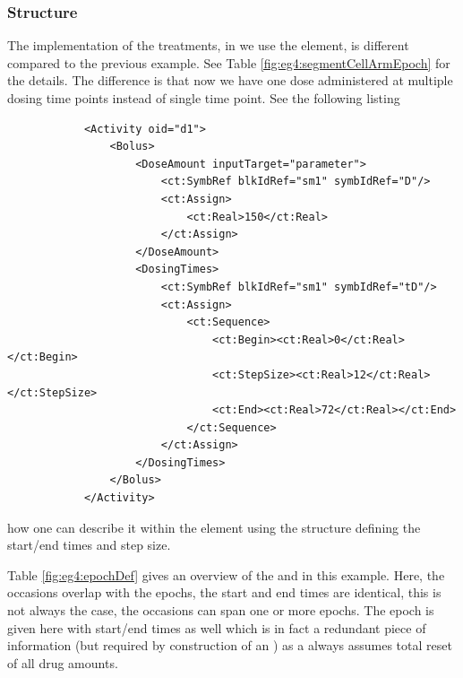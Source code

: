 \subsubsection{Structure}
The implementation of the treatments, in \pharmml we use the
 element, is different compared to the previous example. 
See Table \ref{fig:eg4:segmentCellArmEpoch} for the details. The difference
is that now we have one dose administered at multiple dosing time points 
instead of single time point. See the following listing 
\lstset{language=XML}
\begin{lstlisting}
            <Activity oid="d1">
                <Bolus>
                    <DoseAmount inputTarget="parameter">
                        <ct:SymbRef blkIdRef="sm1" symbIdRef="D"/>
                        <ct:Assign>
                            <ct:Real>150</ct:Real>
                        </ct:Assign>
                    </DoseAmount>
                    <DosingTimes>
                        <ct:SymbRef blkIdRef="sm1" symbIdRef="tD"/>
                        <ct:Assign>
                            <ct:Sequence>
                                <ct:Begin><ct:Real>0</ct:Real></ct:Begin>
                                <ct:StepSize><ct:Real>12</ct:Real></ct:StepSize>
                                <ct:End><ct:Real>72</ct:Real></ct:End>
                            </ct:Sequence>
                        </ct:Assign>
                    </DosingTimes>
                </Bolus>
            </Activity>
\end{lstlisting}

how one can describe it within the  element using the 
structure defining the start/end times and step size.

Table \ref{fig:eg4:epochDef} gives an overview of the  and  
in this example. Here, the occasions overlap with the epochs, the start and end times 
are identical, this is not always the case, the occasions can span one or more epochs. 
The  epoch is given here with start/end times as well which is in fact 
a redundant piece of information (but required by construction of an )
as a  always assumes total reset of all drug amounts. 

